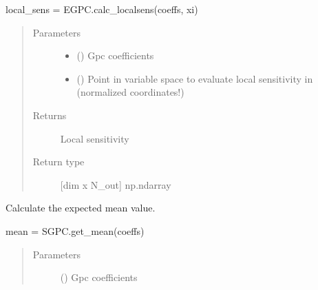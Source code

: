 \documentclass[letterpaper,10pt,english,openany,oneside]{sphinxmanual}
\begin{document}
\begin{fulllineitems}
\begin{fulllineitems}
local\_sens = EGPC.calc\_localsens(coeffs, xi)
\begin{quote}\begin{description}
\item[{Parameters}] \leavevmode\begin{itemize}
\item {} 
 (\sphinxstyleliteralemphasis{\sphinxupquote{{[}}}\sphinxstyleliteralemphasis{\sphinxupquote{{]} }}) \textendash{} Gpc coefficients

\item {} 
 (\sphinxstyleliteralemphasis{\sphinxupquote{{[}}}\sphinxstyleliteralemphasis{\sphinxupquote{{]} }}) \textendash{} Point in variable space to evaluate local sensitivity in (normalized coordinates!)

\end{itemize}

\item[{Returns}] \leavevmode
{} \textendash{} Local sensitivity

\item[{Return type}] \leavevmode
{[}dim x N\_out{]} np.ndarray

\end{description}\end{quote}

\end{fulllineitems}


\begin{fulllineitems}
\label{\detokenize{pygpc:pygpc.EGPC.EGPC.get_mean}}
Calculate the expected mean value.

mean = SGPC.get\_mean(coeffs)
\begin{quote}\begin{description}
\item[{Parameters}] \leavevmode
{} (\sphinxstyleliteralemphasis{\sphinxupquote{{[}}}\sphinxstyleliteralemphasis{\sphinxupquote{{]} }}) \textendash{} Gpc coefficients


\end{description}
\end{quote}
\end{fulllineitems}
\end{fulllineitems}
\end{document}
